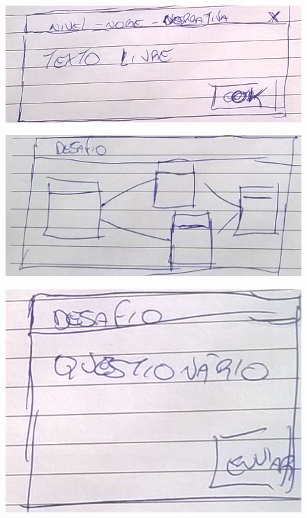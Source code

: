 \documentclass[
	12pt,				%
	oneside,			%
	a4paper,			%
	english,			%
	french,				%
	spanish,			%
	brazil,				%
	]{abntex2}
\begin{document}
\begin{figure}[ht]
\centering
\includegraphics[width=1\textwidth]{imagens/proposta_narrativa.png}
\end{figure}

\begin{figure}[ht]
\centering
\includegraphics[width=1\textwidth]{imagens/proposta_desafio.png}
\end{figure}

\begin{figure}[ht]
\centering
\includegraphics[width=1\textwidth]{imagens/proposta_desafio_questionario.png}
\end{figure}
\end{document}
